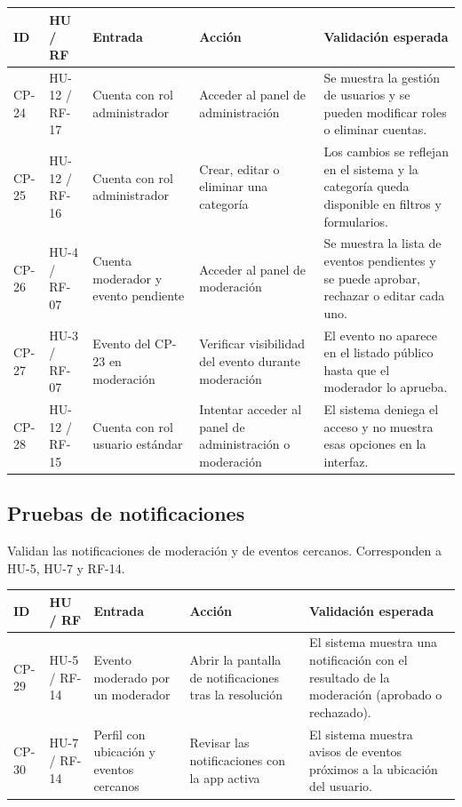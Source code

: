 \begin{longtable}{|p{1.3cm}|p{1.6cm}|p{3cm}|p{3.8cm}|p{4.3cm}|}
\hline
\textbf{ID} & \textbf{HU / RF} & \textbf{Entrada} & \textbf{Acción} & \textbf{Validación esperada} \\
\hline
{}\label{cp:24}CP-24 & HU-12 / RF-17 & Cuenta con rol administrador & Acceder al panel de administración & Se muestra la gestión de usuarios y se pueden modificar roles o eliminar cuentas. \\
\hline
{}\label{cp:25}CP-25 & HU-12 / RF-16 & Cuenta con rol administrador & Crear, editar o eliminar una categoría & Los cambios se reflejan en el sistema y la categoría queda disponible en filtros y formularios. \\
\hline
{}\label{cp:26}CP-26 & HU-4 / RF-07 & Cuenta moderador y evento pendiente & Acceder al panel de moderación & Se muestra la lista de eventos pendientes y se puede aprobar, rechazar o editar cada uno. \\
\hline
{}\label{cp:27}CP-27 & HU-3 / RF-07 & Evento del CP-23 en moderación & Verificar visibilidad del evento durante moderación & El evento no aparece en el listado público hasta que el moderador lo aprueba. \\
\hline
{}\label{cp:28}CP-28 & HU-12 / RF-15 & Cuenta con rol usuario estándar & Intentar acceder al panel de administración o moderación & El sistema deniega el acceso y no muestra esas opciones en la interfaz. \\
\hline
\end{longtable}

\subsection{Pruebas de notificaciones}

Validan las notificaciones de moderación y de eventos cercanos. Corresponden a HU-5, HU-7 y RF-14.

\begin{longtable}{|p{1.3cm}|p{1.6cm}|p{3cm}|p{3.8cm}|p{4.3cm}|}
\hline
\textbf{ID} & \textbf{HU / RF} & \textbf{Entrada} & \textbf{Acción} & \textbf{Validación esperada} \\
\hline
{}\label{cp:29}CP-29 & HU-5 / RF-14 & Evento moderado por un moderador & Abrir la pantalla de notificaciones tras la resolución & El sistema muestra una notificación con el resultado de la moderación (aprobado o rechazado). \\
\hline
{}\label{cp:30}CP-30 & HU-7 / RF-14 & Perfil con ubicación y eventos cercanos & Revisar las notificaciones con la app activa & El sistema muestra avisos de eventos próximos a la ubicación del usuario. \\
\hline
\end{longtable}


